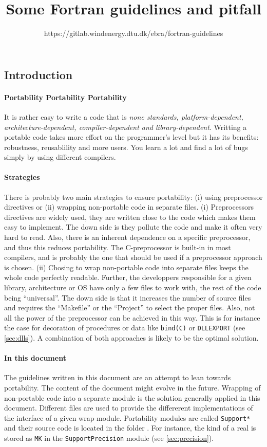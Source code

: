 \documentclass{article}
\title{Some Fortran guidelines and pitfall}
\author{https://gitlab.windenergy.dtu.dk/ebra/fortran-guidelines}
\begin{document}
\maketitle

\tableofcontents

\subsection*{Introduction}
\paragraph{Portability Portability Portability}
It is rather easy to write a code that is \textit{none standards, platform-dependent, architecture-dependent, compiler-dependent and library-dependent}.
Writting a portable code takes more effort on the programmer's level but it has its benefits: robustness, reusablility and more users. You learn a lot and find a lot of bugs simply by using different compilers.

\paragraph{Strategies}
There is probably two main strategies to ensure portability: (i) using preprocessor directives or (ii) wrapping non-portable code in separate files.
(i) Preprocessors directives are widely used, they are written close to the code which makes them easy to implement. The down side is they pollute the code and make it often very hard to read. Also, there is an inherent dependence on a specific preprocessor, and thus this reduces portability. The C-preprocessor is built-in in most compilers, and is probably the one that should be used if a preprocessor approach is chosen. 
(ii) Chosing to wrap non-portable code into separate files keeps the whole code perfectly readable. Further, the developpers responsible for a given library, architecture or OS have only a few files to work with, the rest of the code being ``universal''.
The down side is that it increases the number of source files and requires the ``Makefile'' or the ``Project'' to select the proper files. 
Also, not all the power of the preprocessor can be achieved in this way.
This is for instance the case for decoration of procedures or data like \texttt{bind(C)} or \texttt{DLLEXPORT} (see \autoref{sec:dlls}).
A combination of both approaches is likely to be the optimal solution.

\paragraph{In this document}
The guidelines written in this document are an attempt to lean towards portability. The content of the document might evolve in the future.
Wrapping of non-portable code into a separate module is the solution generally applied in this document. Different files are used to provide the differerent implementations of the interface of a given wrap-module.  Portability modules are called \verb|Support*| and their source code is located in the folder .
For instance, the kind of a real is stored as \verb|MK| in the \verb|SupportPrecision| module (see \autoref{sec:precision}).
\end{document}

